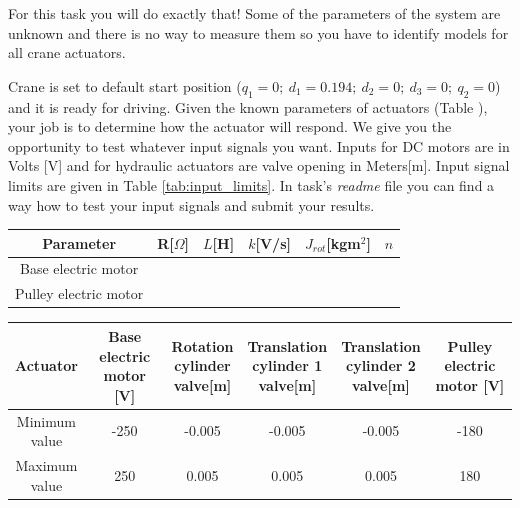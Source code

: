 \documentclass{article}
\begin{document}
	For this task you will do exactly that! Some of the parameters of the system are unknown and there is no way to measure them so you have to identify models for all crane actuators.
	
	Crane is set to default start position ($q_1 = 0; \ d_1 = 0.194; \  d_2 = 0; \  d_3 = 0; \  q_2 = 0$) and it is ready for driving. Given the known parameters of actuators (Table ), your job is to determine how the actuator will respond. We give you the opportunity to test whatever input signals you want.
	Inputs for DC motors are in Volts [V] and for hydraulic actuators are valve opening in Meters[m]. Input signal limits are given in Table \ref{tab:input_limits}.  In task's \textit{readme} file you can find a way how to test your input signals and submit your results.
	
	\begin{center}
		\label{tab:inverse}
		\label{tab:el_params}
		\begin{tabular}{|| c || c c c c c||}
			\hline
			Parameter & R[$\Omega$] & $L$[H] & $k$[V/s] & $J_{rot}$[kgm$^2$] & 
			$n$\\
			\hline\hline
			Base electric motor &  &  &  & &\\ 
			\hline
			Pulley electric motor &  &  &  & & \\
			\hline
		\end{tabular}
	\end{center}
	
	\begin{center}
		
		\label{tab:input_limits}
		\begin{tabular}{|| c || c c c c c ||}
			\hline
			Actuator & \makecell{Base electric \\ motor [V]} & \makecell{Rotation \\ cylinder \\ valve[m]} & \makecell{Translation \\ cylinder 1 \\ valve[m]} & \makecell{Translation \\ cylinder 2 \\ valve[m]} &  \makecell{Pulley electric \\ motor [V]}\\
			\hline\hline
			\makecell{Minimum \\ value} & -250 & -0.005 & -0.005 & -0.005 & -180 \\ 
			\hline
			\makecell{Maximum\\ value} & 250 & 0.005 & 0.005 & 0.005 & 180 \\ 
			\hline
		\end{tabular}
	\end{center}
	
\end{document}
